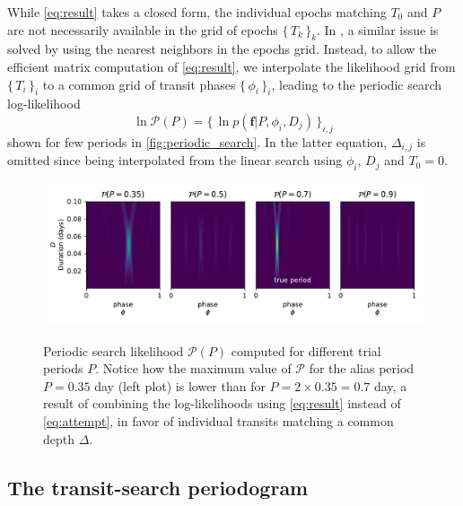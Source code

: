 \documentclass[modern,linenumbers]{aastex631}
\newcommand{\set}[1]{\{\,#1\,\}}
\begin{document}
While \autoref{eq:result} takes a closed form, the individual epochs matching $T_0$ and $P$ are not necessarily available in the grid of epochs $\set{T_k}_k$. In \cite{foreman2016}, a similar issue is solved by using the nearest neighbors in the epochs grid. Instead, to allow the efficient matrix computation of \autoref{eq:result}, we interpolate the likelihood grid from $\set{T_i}_i$ to a common grid of transit phases $\set{\phi_i}_i$, leading to the periodic search log-likelihood
$$\ln\mathcal{P}(P) = \set{\ln p(\bm{f} \vert P, \phi_i, D_j)}_{i,j}$$
shown for few periods in \autoref{fig:periodic_search}. In the latter equation, $\Delta_{i,j}$ is omitted since being interpolated from the linear search using $\phi_i$, $D_j$ and $T_0 = 0$.

\begin{figure}[H]
    \centering
    \includegraphics[width=\linewidth]{../workflows/principle/figures/principle_periodic_1.pdf}\\
    \caption{Periodic search likelihood $\mathcal{P}(P)$ computed for different trial periods $P$. Notice how the maximum value of $\mathcal{P}$ for the alias period $P=0.35$ day (left plot) is lower than for $P=2\times 0.35=0.7$ day, a result of combining the log-likelihoods using \autoref{eq:result} instead of \autoref{eq:attempt}, in favor of individual transits matching a common depth $\Delta$.}
    \label{fig:periodic_search}
\end{figure}

\subsection{The transit-search periodogram}\label{periodogram}
\end{document}

